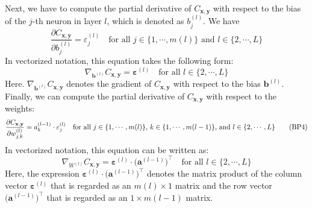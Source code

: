 Next, we have to compute the partial derivative of $C_{\mathbf{x}, \mathbf{y}}$ with respect to the bias of the
$j$-th neuron in layer $l$, which is denoted as $b_j^{(l)}$.  We have
\begin{equation}
  \label{eq:BP3}
  \frac{\partial C_{\mathbf{x}, \mathbf{y}}}{\partial b_j^{(l)}} = \varepsilon_j^{(l)}
  \quad \mbox{for all $j \in \{1,\cdots,m(l)\}$ and $l \in \{2, \cdots,L\}$}
  \tag{BP3}
\end{equation}
In vectorized notation, this equation takes the following form:
\begin{equation}
  \label{eq:BP3v}
  \nabla_{\mathbf{b}^{(l)}} C_{\mathbf{x}, \mathbf{y}} = \boldsymbol{\varepsilon}^{(l)}
  \quad \mbox{for all $l \in \{2, \cdots,L\}$}
  \tag{BP3v}
\end{equation}
Here. $\nabla_{\mathbf{b}^{(l)}} C_{\mathbf{x}, \mathbf{y}}$ denotes the gradient of $C_{\mathbf{x},
  \mathbf{y}}$ with respect to the bias $\mathbf{b}^{(l)}$.
Finally, we can compute the  partial derivative of $C_{\mathbf{x}, \mathbf{y}}$ with respect to the weights:
\begin{equation}
  \label{eq:BP4}
  \frac{\partial C_{\mathbf{x}, \mathbf{y}}}{\partial w_{j,k}^{(l)}} = a_k^{(l-1)} \cdot \varepsilon_j^{(l)}
  \quad \mbox{for all $j \in \{1,\cdots,m(l)\}$, $ k \in \{1,\cdots,m(l-1)\}$, and $l \in \{2, \cdots,L\}$}
  \tag{BP4}
\end{equation}
In vectorized notation, this equation can be written as:
\begin{equation}
  \label{eq:BP4v}
  \nabla_{W^{(l)}} C_{\mathbf{x}, \mathbf{y}} = \boldsymbol{\varepsilon}^{(l)} \cdot \bigl(\mathbf{a}^{(l-1)}\bigr)^\top
  \quad \mbox{for all $l \in \{2, \cdots,L\}$}
  \tag{BP4v}
\end{equation}
Here, the expression $\boldsymbol{\varepsilon}^{(l)} \cdot \bigl(\mathbf{a}^{(l-1)}\bigr)^\top$ denotes the matrix
product of the column vector $\boldsymbol{\varepsilon}^{(l)}$ that is regarded as an $m(l) \times 1$ matrix and the
row vector $\bigl(\mathbf{a}^{(l-1)}\bigr)^\top$ that is regarded as an $1 \times m(l-1)$ matrix.

